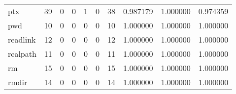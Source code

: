 \begin{longtable}{lrrrrrrrrr}
ptx       &                                      39 &                                                  0 &                                                  0 &                                                  1 &                                                  0 &                                                 38 &                                           0.987179 &                               1.000000 &                             0.974359 \\
pwd       &                                      10 &                                                  0 &                                                  0 &                                                  0 &                                                  0 &                                                 10 &                                           1.000000 &                               1.000000 &                             1.000000 \\
readlink  &                                      12 &                                                  0 &                                                  0 &                                                  0 &                                                  0 &                                                 12 &                                           1.000000 &                               1.000000 &                             1.000000 \\
realpath  &                                      11 &                                                  0 &                                                  0 &                                                  0 &                                                  0 &                                                 11 &                                           1.000000 &                               1.000000 &                             1.000000 \\
rm        &                                      15 &                                                  0 &                                                  0 &                                                  0 &                                                  0 &                                                 15 &                                           1.000000 &                               1.000000 &                             1.000000 \\
rmdir     &                                      14 &                                                  0 &                                                  0 &                                                  0 &                                                  0 &                                                 14 &                                           1.000000 &                               1.000000 &                             1.000000 \\

\end{longtable}
